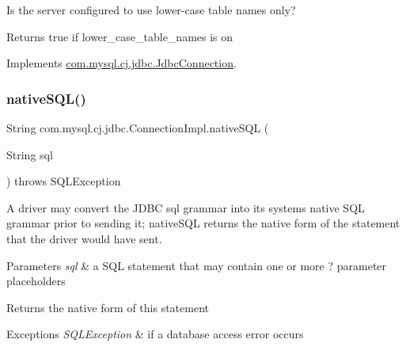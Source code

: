 Is the server configured to use lower-\/case table names only?

\begin{DoxyReturn}{Returns}
true if lower\+\_\+case\+\_\+table\+\_\+names is \textquotesingle{}on\textquotesingle{} 
\end{DoxyReturn}


Implements \mbox{\hyperlink{interfacecom_1_1mysql_1_1cj_1_1jdbc_1_1_jdbc_connection_a54cca6407a1a531b8e65ee3d965a51cd}{com.\+mysql.\+cj.\+jdbc.\+Jdbc\+Connection}}.

\mbox{\label{classcom_1_1mysql_1_1cj_1_1jdbc_1_1_connection_impl_a6c1d69bc49b04ac714fbe2e79062f2c1}} 
\subsubsection{\texorpdfstring{native\+S\+Q\+L()}{nativeSQL()}}
{\footnotesize\ttfamily String com.\+mysql.\+cj.\+jdbc.\+Connection\+Impl.\+native\+S\+QL (\begin{DoxyParamCaption}\item[{String}]{sql }\end{DoxyParamCaption}) throws S\+Q\+L\+Exception}

A driver may convert the J\+D\+BC sql grammar into its system\textquotesingle{}s native S\+QL grammar prior to sending it; native\+S\+QL returns the native form of the statement that the driver would have sent.


\begin{DoxyParams}{Parameters}
{\em sql} & a S\+QL statement that may contain one or more \textquotesingle{}?\textquotesingle{} parameter placeholders \\
\hline
\end{DoxyParams}
\begin{DoxyReturn}{Returns}
the native form of this statement 
\end{DoxyReturn}

\begin{DoxyExceptions}{Exceptions}
{\em S\+Q\+L\+Exception} & if a database access error occurs \\
\hline
\end{DoxyExceptions}
\mbox{\label{classcom_1_1mysql_1_1cj_1_1jdbc_1_1_connection_impl_a790847769075cca4f1f42d47b864f3e3}} 
